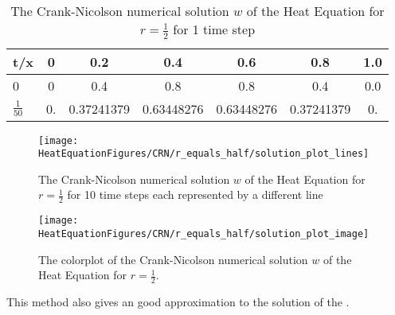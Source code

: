 \begin{example}
\begin{center}
\begin{table}[H]
 \caption{The Crank-Nicolson numerical solution $w$ of the Heat Equation for $r=\frac{1}{2}$ for 1 time step}
 \centering
\begin{tabular}{l|cccccc}
t/x&0&0.2&0.4&0.6&0.8&1.0\\ \hline
0&0&0.4&0.8&0.8&0.4&0.0\\
$\frac{1}{50}$&0.    &      0.37241379  & 0.63448276 & 0.63448276  & 0.37241379 & 0.
\end{tabular}
\end{table}
\end{center}

\begin{figure}[H]
  \caption{The Crank-Nicolson numerical solution $w$ of the Heat Equation for $r=\frac{1}{2}$ for 10 time steps each represented by a different line}
  \centering
    \texttt{[image: HeatEquationFigures/CRN/r\_equals\_half/solution\_plot\_lines]}
\end{figure}


\begin{figure}[H]
  \caption{The colorplot of the Crank-Nicolson numerical solution $w$ of the Heat Equation for $r=\frac{1}{2}$.}
  \centering
    \texttt{[image: HeatEquationFigures/CRN/r\_equals\_half/solution\_plot\_image]}
\end{figure}


This method also gives an good approximation to the solution of the .
\end{example}
